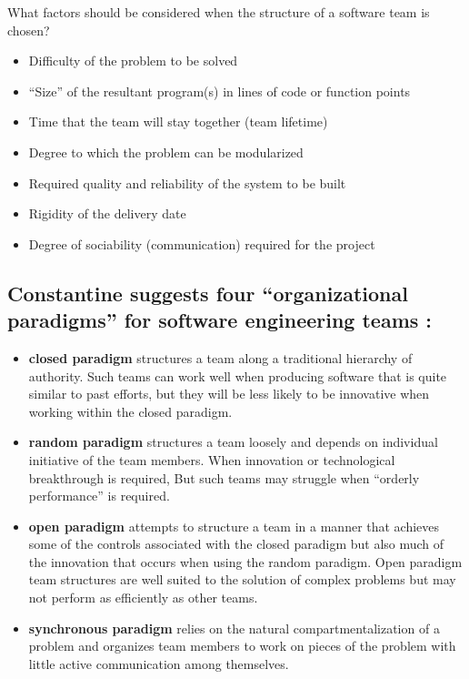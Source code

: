 \documentclass[12pt]{article}
\begin{document}
What factors
should be
considered when
the structure of a
software team is
chosen?

\begin{itemize}
	\item Difficulty of the problem to be solved
	\item “Size” of the resultant program(s) in lines of code or function points
	\item Time that the team will stay together (team lifetime)
	\item Degree to which the problem can be modularized
	\item Required quality and reliability of the system to be built
	\item Rigidity of the delivery date
	\item Degree of sociability (communication) required for the project
\end{itemize}




\subsection{Constantine suggests four “organizational paradigms” for software
engineering teams :}

\begin{itemize}
	\item \textbf{closed paradigm} structures a team along a traditional hierarchy of authority.
Such teams can work well when producing software that is quite similar to
past efforts, but they will be less likely to be innovative when working within
the closed paradigm.
	\item \textbf{random paradigm} structures a team loosely and depends on individual initiative of the team members. When innovation or technological breakthrough
is required, But such teams
may struggle when “orderly performance” is required.
	\item \textbf{open paradigm} attempts to structure a team in a manner that achieves
some of the controls associated with the closed paradigm but also much
of the innovation that occurs when using the random paradigm. Open paradigm
team structures are well suited to the solution of complex problems but may
not perform as efficiently as other teams.
	\item \textbf{synchronous paradigm} relies on the natural compartmentalization of a
problem and organizes team members to work on pieces of the problem with
little active communication among themselves.
\end{itemize}
\end{document}
